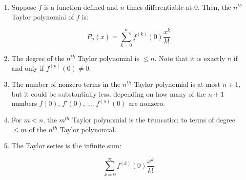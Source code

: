 \documentclass{amsart}
\begin{document}
\begin{enumerate}
\item Suppose $f$ is a function defined and $n$ times differentiable
  at $0$. Then, the $n^{th}$ Taylor polynomial of $f$ is:

  $$P_n(x) = \sum_{k=0}^n f^{(k)}(0) \frac{x^k}{k!}$$

\item The degree of the $n^{th}$ Taylor polynomial is $\le n$. Note
  that it is exactly $n$ if and only if $f^{(n)}(0) \ne 0$.
\item The number of nonzero terms in the $n^{th}$ Taylor polynomial is
  at most $n + 1$, but it could be substantially less, depending on
  how many of the $n + 1$ numbers $f(0)$, $f'(0)$, $\dots, f^{(n)}(0)$
  are nonzero.
\item For $m < n$, the $m^{th}$ Taylor polynomial is the truncation to
  terms of degree $\le m$ of the $n^{th}$ Taylor polynomial.
\item The Taylor series is the infinite sum:

  $$\sum_{k=0}^\infty f^{(k)}(0) \frac{x^k}{k!}$$


\end{enumerate}
\end{document}
